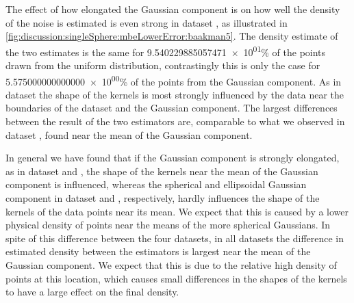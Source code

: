 		The effect of how elongated the Gaussian component is on how well the density of the noise is estimated is even strong in dataset \baakmanFive, as illustrated in \cref{fig:discussion:singleSphere:mbeLowerError:baakman5}. The density estimate of the two estimates is the same for \num{9.540229885057471e+01}\% of the points drawn from the uniform distribution, contrastingly this is only the case for \num{5.575000000000000e+00}\% of the points from the Gaussian component. 
		As in dataset \baakmanFour the shape of the kernels is most strongly influenced by the data near the boundaries of the dataset and the Gaussian component.
		The largest differences between the result of the two estimators are, comparable to what we observed in dataset \baakmanFour, found near the mean of the Gaussian component. 

In general we have found that if the Gaussian component is strongly elongated, as in dataset \baakmanFour and \baakmanFive, the shape of the kernels near the mean of the Gaussian component is influenced, whereas the spherical and ellipsoidal Gaussian component in dataset \ferdosiOne and \baakmanOne, respectively, hardly influences the shape of the kernels of the data points near its mean. We expect that this is caused by a lower physical density of points near the means of the more spherical Gaussians. 
In spite of this difference between the four datasets, in all datasets the difference in estimated density between the estimators is largest near the mean of the Gaussian component. We expect that this is due to the relative high density of points at this location, which causes small differences in the shapes of the kernels to have a large effect on the final density. 